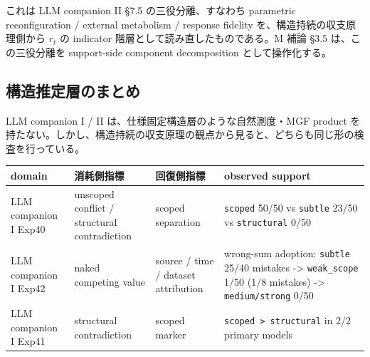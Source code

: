 \documentclass[12pt,a4paper]{article}
\begin{document}
これは LLM companion II §7.5 の三役分離、すなわち parametric reconfiguration / external metabolism / response fidelity を、構造持続の収支原理側から \(r_{t}\) の indicator 階層として読み直したものである。M 補論 §3.5 は、この三役分離を support-side component decomposition として操作化する。

\subsection{構造推定層のまとめ}\label{ux69cbux9020ux63a8ux5b9aux5c64ux306eux307eux3068ux3081}

LLM companion I / II は、仕様固定構造層のような自然測度・MGF product を持たない。しかし、構造持続の収支原理の観点から見ると、どちらも同じ形の検査を行っている。

{\def\LTcaptype{table} %
\begin{longtable}[]{@{}
  >{\raggedright\arraybackslash}p{}
  >{\raggedright\arraybackslash}p{}
  >{\raggedright\arraybackslash}p{}
  >{\raggedright\arraybackslash}p{}@{}}
\toprule\noalign{}
\begin{minipage}[b]{\linewidth}\raggedright
domain
\end{minipage} & \begin{minipage}[b]{\linewidth}\raggedright
消耗側指標
\end{minipage} & \begin{minipage}[b]{\linewidth}\raggedright
回復側指標
\end{minipage} & \begin{minipage}[b]{\linewidth}\raggedright
observed support
\end{minipage} \\
\midrule\noalign{}
\endhead
\bottomrule\noalign{}
\endlastfoot
LLM companion I Exp40 & unscoped conflict / structural contradiction & scoped separation & \texttt{scoped} 50/50 vs \texttt{subtle} 23/50 vs \texttt{structural} 0/50 \\
LLM companion I Exp42 & naked competing value & source / time / dataset attribution & wrong-sum adoption: \texttt{subtle} 25/40 mistakes -\textgreater{} \texttt{weak\_scope} 1/50 (1/8 mistakes) -\textgreater{} \texttt{medium/strong} 0/50 \\
LLM companion I Exp41 & structural contradiction & scoped marker & \texttt{scoped\ \textgreater{}\ structural} in 2/2 primary models \\

\end{longtable}}
\end{document}
